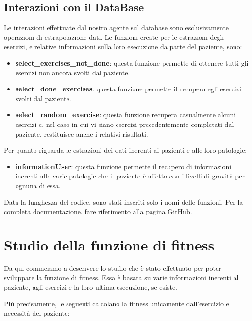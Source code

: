 \documentclass{article}
\begin{document}
\pagebreak

    \subsection{Interazioni con il DataBase}
    Le interazioni effettuate dal nostro agente sul database sono esclusivamente operazioni di estrapolazione dati. Le funzioni create per le estrazioni degli esercizi, e relative informazioni sulla loro esecuzione da parte del paziente, sono:
    \begin{itemize}
        \item\textbf{select\_exercises\_not\_done}: questa funzione permette di ottenere tutti gli esercizi non ancora svolti dal paziente.

        \item\textbf{select\_done\_exercises}: questa funzione permette il recupero egli esercizi svolti dal paziente.

        \item\textbf{select\_random\_exercise}: questa funzione recupera casualmente alcuni esercizi e, nel caso in cui vi siano esercizi precedentemente completati dal paziente, restituisce anche i relativi risultati.

    \end{itemize}
    Per quanto riguarda le estrazioni dei dati inerenti ai pazienti e alle loro patologie:
    \begin{itemize}
        \item\textbf{informationUser}: questa funzione permette il recupero di informazioni inerenti alle varie patologie che il paziente è affetto con i livelli di gravità per ognuna di essa.

    \end{itemize}

    Data la lunghezza del codice, sono stati inseriti solo i nomi delle funzioni. Per la completa documentazione, fare riferimento alla pagina GitHub.

\pagebreak

    \section{Studio della funzione di fitness}
    Da qui cominciamo a descrivere lo studio che è stato effettuato per poter sviluppare la funzione di fitness. Essa è basata su varie informazioni inerenti al paziente, agli esercizi e la loro ultima esecuzione, se esiste. 
    
    Più precisamente, le seguenti calcolano la fitness unicamente dall'esercizio e necessità del paziente:
\end{document}
